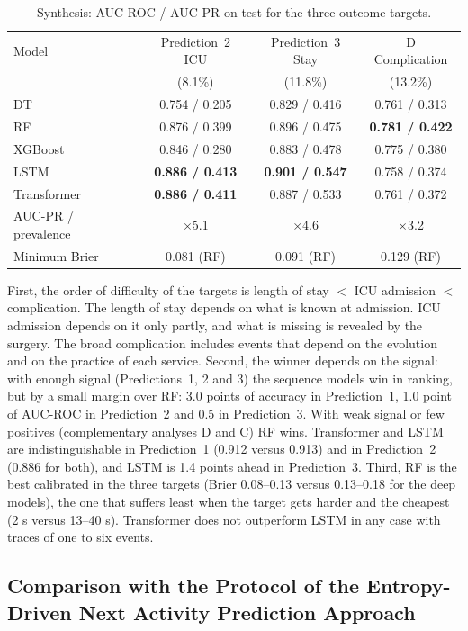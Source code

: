 \begin{table}[htbp]
\centering
\caption{Synthesis: AUC-ROC / AUC-PR on test for the three outcome targets.}
\label{tab:sintesis}
\small
\begin{tabular}{lccc}
\toprule
Model & Prediction~2 ICU & Prediction~3 Stay & D Complication \\
 & (8.1\%) & (11.8\%) & (13.2\%) \\
\midrule
DT & 0.754 / 0.205 & 0.829 / 0.416 & 0.761 / 0.313 \\
RF & 0.876 / 0.399 & 0.896 / 0.475 & \textbf{0.781 / 0.422} \\
XGBoost & 0.846 / 0.280 & 0.883 / 0.478 & 0.775 / 0.380 \\
LSTM & \textbf{0.886 / 0.413} & \textbf{0.901 / 0.547} & 0.758 / 0.374 \\
Transformer & \textbf{0.886 / 0.411} & 0.887 / 0.533 & 0.761 / 0.372 \\
\midrule
AUC-PR / prevalence & $\times$5.1 & $\times$4.6 & $\times$3.2 \\
Minimum Brier & 0.081 (RF) & 0.091 (RF) & 0.129 (RF) \\
\bottomrule
\end{tabular}
\end{table}

First, the order of difficulty of the targets is length of stay $<$ ICU admission $<$ complication. The length of stay depends on what is known at admission. ICU admission depends on it only partly, and what is missing is revealed by the surgery. The broad complication includes events that depend on the evolution and on the practice of each service. Second, the winner depends on the signal: with enough signal (Predictions~1, 2 and 3) the sequence models win in ranking, but by a small margin over RF: 3.0 points of accuracy in Prediction~1, 1.0 point of AUC-ROC in Prediction~2 and 0.5 in Prediction~3. With weak signal or few positives (complementary analyses D and C) RF wins. Transformer and LSTM are indistinguishable in Prediction~1 (0.912 versus 0.913) and in Prediction~2 (0.886 for both), and LSTM is 1.4 points ahead in Prediction~3. Third, RF is the best calibrated in the three targets (Brier 0.08--0.13 versus 0.13--0.18 for the deep models), the one that suffers least when the target gets harder and the cheapest (2 s versus 13--40 s). Transformer does not outperform LSTM in any case with traces of one to six events.

\subsection{Comparison with the Protocol of the Entropy-Driven Next Activity Prediction Approach}

